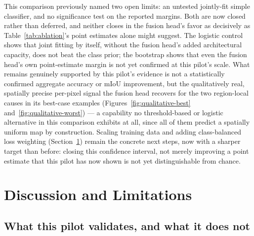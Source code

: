\documentclass[review]{elsarticle}
\begin{document}
This comparison previously named two open limits: an untested jointly-fit simple classifier, and no significance test on the reported margins. Both are now closed rather than deferred, and neither closes in the fusion head's favor as decisively as Table~\ref{tab:ablation}'s point estimates alone might suggest. The logistic control shows that joint fitting by itself, without the fusion head's added architectural capacity, does not beat the class prior; the bootstrap shows that even the fusion head's own point-estimate margin is not yet confirmed at this pilot's scale. What remains genuinely supported by this pilot's evidence is not a statistically confirmed aggregate accuracy or mIoU improvement, but the qualitatively real, spatially precise per-pixel signal the fusion head recovers for the two region-local causes in its best-case examples (Figures~\ref{fig:qualitative-best} and~\ref{fig:qualitative-worst}) — a capability no threshold-based or logistic alternative in this comparison exhibits at all, since all of them predict a spatially uniform map by construction. Scaling training data and adding class-balanced loss weighting (Section~\ref{sec:discussion}) remain the concrete next steps, now with a sharper target than before: closing this confidence interval, not merely improving a point estimate that this pilot has now shown is not yet distinguishable from chance.

\FloatBarrier
\section{Discussion and Limitations}
\label{sec:discussion}

\subsection{What this pilot validates, and what it does not}
\end{document}
